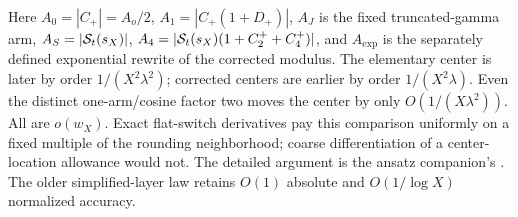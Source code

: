 Here $A_0=|C_+|=A_o/2$, $A_1=|C_+(1+D_+)|$,
$A_J$ is the fixed truncated-gamma arm, $A_S=|\mathcal S_t(s_X)|$,
$A_4=|\mathcal S_t(s_X)(1+C_2^++C_4^+)|$, and $A_{\exp}$ is the
separately defined exponential rewrite of the corrected modulus.
The elementary center is later by order $1/(X^2\lambda^2)$; corrected
centers are earlier by order $1/(X^2\lambda)$. Even the distinct
one-arm/cosine factor two moves the center by only
$O(1/(X\lambda^2))$. All are $o(w_X)$. Exact flat-switch derivatives
pay this comparison uniformly on a fixed multiple of the rounding
neighborhood; coarse differentiation of a center-location allowance
would not. The detailed argument is the ansatz companion's
.
The older simplified-layer law retains $O(1)$ absolute and
$O(1/\log X)$ normalized accuracy.

